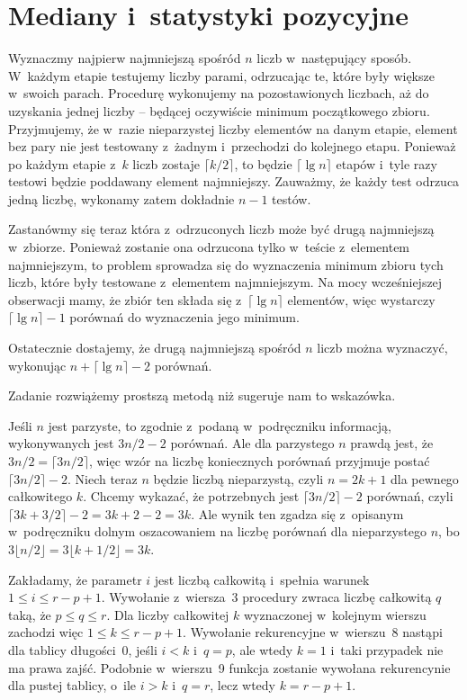 \chapter{Mediany i~statystyki pozycyjne}


\exercise %
Wyznaczmy najpierw najmniejszą spośród $n$ liczb w~następujący sposób. W~każdym etapie testujemy liczby parami, odrzucając te, które były większe w~swoich parach. Procedurę wykonujemy na pozostawionych liczbach, aż do uzyskania jednej liczby -- będącej oczywiście minimum początkowego zbioru. Przyjmujemy, że w~razie nieparzystej liczby elementów na danym etapie, element bez pary nie jest testowany z~żadnym i~przechodzi do kolejnego etapu. Ponieważ po każdym etapie z~$k$ liczb zostaje $\lceil k/2\rceil$, to będzie $\lceil\lg n\rceil$ etapów i~tyle razy testowi będzie poddawany element najmniejszy. Zauważmy, że każdy test odrzuca jedną liczbę, wykonamy zatem dokładnie $n-1$ testów.

Zastanówmy się teraz która z~odrzuconych liczb może być drugą najmniejszą w~zbiorze. Ponieważ zostanie ona odrzucona tylko w~teście z~elementem najmniejszym, to problem sprowadza się do wyznaczenia minimum zbioru tych liczb, które były testowane z~elementem najmniejszym. Na mocy wcześniejszej obserwacji mamy, że zbiór ten składa się z~$\lceil\lg n\rceil$ elementów, więc wystarczy $\lceil\lg n\rceil-1$ porównań do wyznaczenia jego minimum.

Ostatecznie dostajemy, że drugą najmniejszą spośród $n$ liczb można wyznaczyć, wykonując $n+\lceil\lg n\rceil-2$ porównań.

\exercise %
Zadanie rozwiążemy prostszą metodą niż sugeruje nam to wskazówka.

Jeśli $n$ jest parzyste, to zgodnie z~podaną w~podręczniku informacją, wykonywanych jest $3n/2-2$ porównań. Ale dla parzystego $n$ prawdą jest, że $3n/2=\lceil3n/2\rceil$, więc wzór na liczbę koniecznych porównań przyjmuje postać $\lceil3n/2\rceil-2$. Niech teraz $n$ będzie liczbą nieparzystą, czyli $n=2k+1$ dla pewnego całkowitego $k$. Chcemy wykazać, że potrzebnych jest $\lceil3n/2\rceil-2$ porównań, czyli $\lceil3k+3/2\rceil-2=3k+2-2=3k$. Ale wynik ten zgadza się z~opisanym w~podręczniku dolnym oszacowaniem na liczbę porównań dla nieparzystego $n$, bo $3\lfloor n/2\rfloor=3\lfloor k+1/2\rfloor=3k$.


\exercise %
Zakładamy, że parametr $i$ jest liczbą całkowitą i~spełnia warunek $1\le i\le r-p+1$. Wywołanie z~wiersza~3 procedury  zwraca liczbę całkowitą $q$ taką, że $p\le q\le r$. Dla liczby całkowitej $k$ wyznaczonej w~kolejnym wierszu zachodzi więc $1\le k\le r-p+1$. Wywołanie rekurencyjne w~wierszu~8 nastąpi dla tablicy długości~0, jeśli $i<k$ i~$q=p$, ale wtedy $k=1$ i~taki przypadek nie ma prawa zajść. Podobnie w~wierszu~9 funkcja zostanie wywołana rekurencynie dla pustej tablicy, o~ile $i>k$ i~$q=r$, lecz wtedy $k=r-p+1$.

